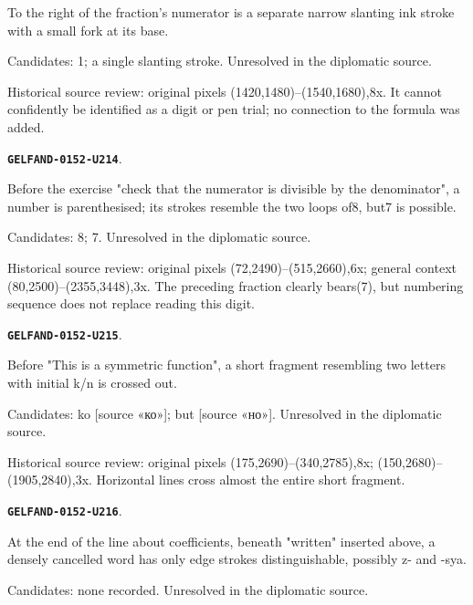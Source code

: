 \documentclass[11pt]{article}
\theoremstyle{definition}
\theoremstyle{remark}
\begin{document}
To the right of the fraction's numerator is a separate narrow slanting ink stroke with a small fork at its base.\par
Candidates: 1; a single slanting stroke. Unresolved in the diplomatic source.\par
Historical source review: original pixels (1420,1480)–(1540,1680),8x. It cannot confidently be identified as a digit or pen trial; no connection to the formula was added.\par\medskip
\par\noindent\leavevmode{}\label{GELFAND-0152-U214}\label{GELFAND-P001400:exercise-number:note}\textbf{\texttt{GELFAND-0152-U214}}.\nopagebreak[4]\par
Before the exercise "check that the numerator is divisible by the denominator", a number is parenthesised; its strokes resemble the two loops of8, but7 is possible.\par
Candidates: 8; 7. Unresolved in the diplomatic source.\par
Historical source review: original pixels (72,2490)–(515,2660),6x; general context (80,2500)–(2355,3448),3x. The preceding fraction clearly bears(7), but numbering sequence does not replace reading this digit.\par\medskip
\par\noindent\leavevmode{}\label{GELFAND-0152-U215}\label{GELFAND-P001400:cancelled-before-eto:note}\textbf{\texttt{GELFAND-0152-U215}}.\nopagebreak[4]\par
Before "This is a symmetric function", a short fragment resembling two letters with initial k/n is crossed out.\par
Candidates: ko [source «ко»]; but [source «но»]. Unresolved in the diplomatic source.\par
Historical source review: original pixels (175,2690)–(340,2785),8x; (150,2680)–(1905,2840),3x. Horizontal lines cross almost the entire short fragment.\par\medskip
\par\noindent\leavevmode{}\label{GELFAND-0152-U216}\label{GELFAND-P001400:cancelled-right-word:note}\textbf{\texttt{GELFAND-0152-U216}}.\nopagebreak[4]\par
At the end of the line about coefficients, beneath "written" inserted above, a densely cancelled word has only edge strokes distinguishable, possibly z- and -sya.\par
Candidates: none recorded. Unresolved in the diplomatic source.\par
\end{document}
